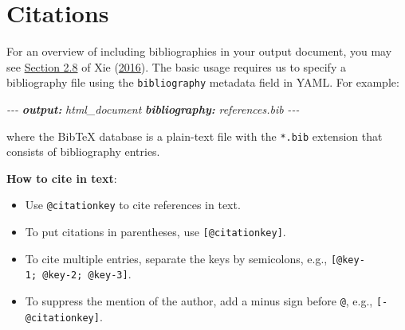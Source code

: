 \documentclass[
]{book}
\newenvironment{Shaded}{\begin{snugshade}}{\end{snugshade}}
\newcommand{\AnnotationTok}[1]{\textcolor[rgb]{0.56,0.35,0.01}{\textbf{\textit{#1}}}}
\newcommand{\CommentTok}[1]{\textcolor[rgb]{0.56,0.35,0.01}{\textit{#1}}}
\theoremstyle{definition}
\theoremstyle{definition}
\theoremstyle{definition}
\theoremstyle{definition}
\theoremstyle{remark}
\begin{document}
\section{Citations}\label{citations}

For an overview of including bibliographies in your output document, you may see \href{https://bookdown.org/yihui/bookdown/citations.html}{Section 2.8} of Xie (\href{https://bookdown.org/yihui/rmarkdown-cookbook/bibliography.html\#ref-bookdown2016}{2016}). The basic usage requires us to specify a bibliography file using the \texttt{bibliography} metadata field in YAML. For example:

\begin{Shaded}
\begin{Highlighting}[]
\CommentTok{{-}{-}{-}}
\AnnotationTok{output:}\CommentTok{ html\_document}
\AnnotationTok{bibliography:}\CommentTok{ references.bib  }
\CommentTok{{-}{-}{-}}
\end{Highlighting}
\end{Shaded}

where the BibTeX database is a plain-text file with the \texttt{*.bib} extension that consists of bibliography entries.

\textbf{How to cite in text}:

\begin{itemize}
\item
  Use \texttt{@citationkey} to cite references in text.
\item
  To put citations in parentheses, use \texttt{{[}@citationkey{]}}.
\item
  To cite multiple entries, separate the keys by semicolons, e.g., \texttt{{[}@key-1;\ @key-2;\ @key-3{]}}.
\item
  To suppress the mention of the author, add a minus sign before \texttt{@}, e.g., \texttt{{[}-@citationkey{]}}.
\end{itemize}
\end{document}
